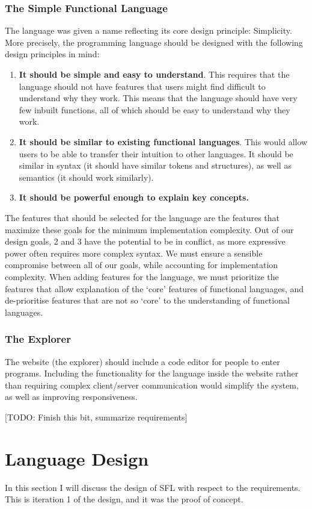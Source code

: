 \subsubsection{The Simple Functional Language}
\label{design:goals}
The language was given a name reflecting its core design principle: Simplicity. More precisely, the programming language should be designed with the following design principles in mind:
\begin{enumerate}
    \item \textbf{It should be simple and easy to understand}. This requires that the language should not have features that users might find difficult to understand why they work. This means that the language should have very few inbuilt functions, all of which should be easy to understand why they work. 
    \item \textbf{It should be similar to existing functional languages}. This would allow users to be able to transfer their intuition to other languages. It should be similar in syntax (it should have similar tokens and structures), as well as semantics (it should work similarly). 
    \item \textbf{It should be powerful enough to explain key concepts.}
\end{enumerate}
The features that should be selected for the language are the features that maximize these goals for the minimum implementation complexity. Out of our design goals, 2 and 3 have the potential to be in conflict, as more expressive power often requires more complex syntax. We must ensure a sensible compromise between all of our goals, while accounting for implementation complexity. When adding features for the language, we must prioritize the features that allow explanation of the `core' features of functional languages, and de-prioritise features that are not so `core' to the understanding of functional languages. 

\subsubsection{The Explorer}
The website (the explorer) should include a code editor for people to enter programs. Including the functionality for the language inside the website rather than requiring complex client/server communication would simplify the system, as well as improving responsiveness. 

[TODO: Finish this bit, summarize requirements]

\section{Language Design}
In this section I will discuss the design of \ac{SFL} with respect to the requirements. This is iteration 1 of the design, and it was the proof of concept.  

